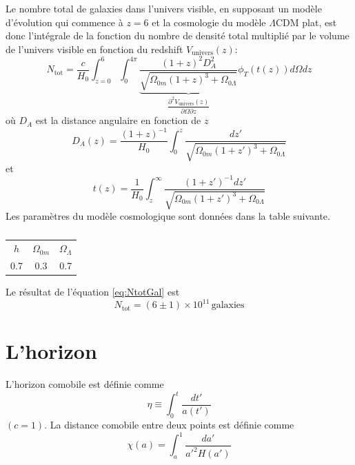 \documentclass{article}
\numberwithin{equation}{section}
\begin{document}
Le nombre total de galaxies dans l'univers visible, 
en supposant un modèle d'évolution
qui commence à $z = 6$ et la cosmologie du modèle $\Lambda \text{CDM}$ plat, est 
donc l'intégrale de la fonction du nombre de densité total multiplié par 
le volume de l'univers visible en fonction du redshift $V_{\text{univers}}(z)$:
\begin{equation}\label{eq:NtotGal} 
        N_{\text{tot}} = \frac{c}{H_0} \int_{z=0}^{6} 
        \int_0^{4 \pi} 
        \underbrace{\frac{(1 + z)^{2} D_A^{2}}{
        \sqrt{\Omega_{0m}(1 + z)^{3} + \Omega_{0\Lambda}}}}_{
\dfrac{\partial^{2} V_{\text{univers}}(z)}{\partial \Omega \partial z}}
        \phi_T(t(z)) d\Omega dz
\end{equation} 
où $D_A$ est la distance angulaire en fonction de $z$
\begin{equation}\label{eq:DA} 
        D_A(z) =  \frac{(1 + z)^{-1}}{H_0}\int_0^{z} \frac{dz'}{\sqrt{\Omega_{0m}(1 + z')^{3} 
        + \Omega_{0\Lambda}}}
\end{equation} 
et
\begin{equation}\label{eq:t(z)} 
        t(z) = \frac{1}{H_0}\int_z^{\infty } \frac{(1 + z')^{-1} dz'}{
        \sqrt{\Omega_{0m}(1 + z')^{3} + \Omega_{0\Lambda}}}
\end{equation} 
Les paramètres du modèle cosmologique sont données dans la table suivante.
\begin{table}[H]
        \centering
        \begin{tabular}{ccc}
                \toprule
                $h$ & $\Omega_{0m}$ & $\Omega_\Lambda$ \\
                0.7 & 0.3 & 0.7 \\
                \bottomrule
                
        \end{tabular}
        \caption{}
        \label{tab:}
\end{table}
Le résultat de l'équation \eqref{eq:NtotGal} est 
\[
        \boxed{N_{\text{tot}} = (6 \pm 1) \times 10^{11}\, \text{galaxies}}
\]


\section{L'horizon}
L'horizon comobile est définie comme
\[
        \eta \equiv \int_0^t \frac{dt'}{a(t')}
\]
$(c = 1)$. La distance comobile entre deux points est définie comme
\[
        \chi(a) = \int_a^{1} \frac{da'}{a'^2 H(a')}
\]
\end{document}
